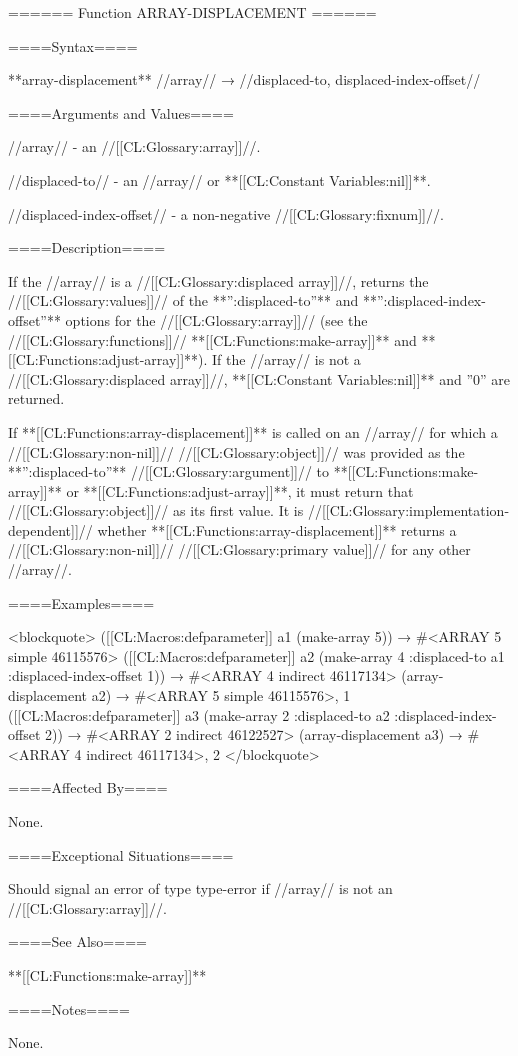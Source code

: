 ====== Function ARRAY-DISPLACEMENT ======

====Syntax====

**array-displacement** //array// → //displaced-to, displaced-index-offset//

====Arguments and Values====

//array// - an //[[CL:Glossary:array]]//.

//displaced-to// - an //array// or **[[CL:Constant Variables:nil]]**.

//displaced-index-offset// - a non-negative //[[CL:Glossary:fixnum]]//.

====Description====

If the //array// is a //[[CL:Glossary:displaced array]]//, returns the //[[CL:Glossary:values]]// of the **'':displaced-to''** and **'':displaced-index-offset''** options for the //[[CL:Glossary:array]]// (see the //[[CL:Glossary:functions]]// **[[CL:Functions:make-array]]** and **[[CL:Functions:adjust-array]]**). If the //array// is not a //[[CL:Glossary:displaced array]]//, **[[CL:Constant Variables:nil]]** and ''0'' are returned.

If **[[CL:Functions:array-displacement]]** is called on an //array// for which a //[[CL:Glossary:non-nil]]// //[[CL:Glossary:object]]// was provided as the **'':displaced-to''** //[[CL:Glossary:argument]]// to **[[CL:Functions:make-array]]** or **[[CL:Functions:adjust-array]]**, it must return that //[[CL:Glossary:object]]// as its first value. It is //[[CL:Glossary:implementation-dependent]]// whether **[[CL:Functions:array-displacement]]** returns a //[[CL:Glossary:non-nil]]// //[[CL:Glossary:primary value]]// for any other //array//.

====Examples====

<blockquote> ([[CL:Macros:defparameter]] a1 (make-array 5)) → #<ARRAY 5 simple 46115576> ([[CL:Macros:defparameter]] a2 (make-array 4 :displaced-to a1 :displaced-index-offset 1)) → #<ARRAY 4 indirect 46117134> (array-displacement a2) → #<ARRAY 5 simple 46115576>, 1 ([[CL:Macros:defparameter]] a3 (make-array 2 :displaced-to a2 :displaced-index-offset 2)) → #<ARRAY 2 indirect 46122527> (array-displacement a3) → #<ARRAY 4 indirect 46117134>, 2 </blockquote>

====Affected By====

None.

====Exceptional Situations====

Should signal an error of type type-error if //array// is not an //[[CL:Glossary:array]]//.

====See Also====

**[[CL:Functions:make-array]]**

====Notes====

None.

